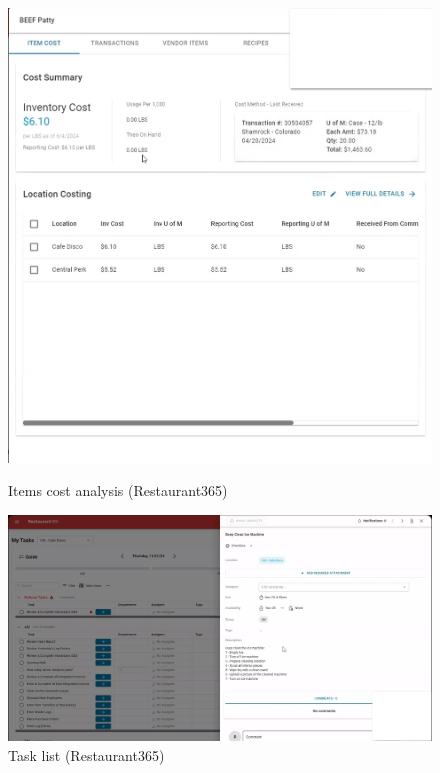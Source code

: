 \documentclass[]{VUMIFTemplateClass}
\begin{document}
\begin{figure}[h]
    \centering
    \begin{minipage}{0.48\textwidth}
        \centering
        \includegraphics[width=\textwidth]{images/examples/items_cost_r365.png}
        \caption{Items cost analysis (Restaurant365)}
    \end{minipage}
    \hfill
    \begin{minipage}{0.48\textwidth}
        \centering
        \includegraphics[width=\textwidth]{images/examples/more_tasks_r365.png}
        \caption{Task list (Restaurant365)}
    \end{minipage}
\end{figure}
\end{document}
